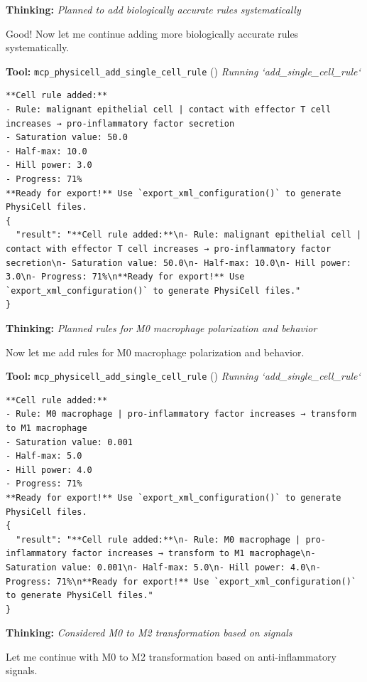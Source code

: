 \documentclass[11pt,a4paper]{article}
\begin{document}
\begin{thinkbox}
\textbf{Thinking:} \textit{Planned to add biologically accurate rules systematically}

Good! Now let me continue adding more biologically accurate rules systematically.

\end{thinkbox}
\begin{toolokbox}
\textbf{Tool:} \texttt{mcp\_physicell\_add\_single\_cell\_rule} (\checkmark)
\textit{Running `add\_single\_cell\_rule`}
\begin{lstlisting}
**Cell rule added:**
- Rule: malignant epithelial cell | contact with effector T cell increases → pro-inflammatory factor secretion
- Saturation value: 50.0
- Half-max: 10.0
- Hill power: 3.0
- Progress: 71%
**Ready for export!** Use `export_xml_configuration()` to generate PhysiCell files.
{
  "result": "**Cell rule added:**\n- Rule: malignant epithelial cell | contact with effector T cell increases → pro-inflammatory factor secretion\n- Saturation value: 50.0\n- Half-max: 10.0\n- Hill power: 3.0\n- Progress: 71%\n**Ready for export!** Use `export_xml_configuration()` to generate PhysiCell files."
}
\end{lstlisting}
\end{toolokbox}
\begin{thinkbox}
\textbf{Thinking:} \textit{Planned rules for M0 macrophage polarization and behavior}

Now let me add rules for M0 macrophage polarization and behavior.

\end{thinkbox}
\begin{toolokbox}
\textbf{Tool:} \texttt{mcp\_physicell\_add\_single\_cell\_rule} (\checkmark)
\textit{Running `add\_single\_cell\_rule`}
\begin{lstlisting}
**Cell rule added:**
- Rule: M0 macrophage | pro-inflammatory factor increases → transform to M1 macrophage
- Saturation value: 0.001
- Half-max: 5.0
- Hill power: 4.0
- Progress: 71%
**Ready for export!** Use `export_xml_configuration()` to generate PhysiCell files.
{
  "result": "**Cell rule added:**\n- Rule: M0 macrophage | pro-inflammatory factor increases → transform to M1 macrophage\n- Saturation value: 0.001\n- Half-max: 5.0\n- Hill power: 4.0\n- Progress: 71%\n**Ready for export!** Use `export_xml_configuration()` to generate PhysiCell files."
}
\end{lstlisting}
\end{toolokbox}
\begin{thinkbox}
\textbf{Thinking:} \textit{Considered M0 to M2 transformation based on signals}

Let me continue with M0 to M2 transformation based on anti-inflammatory signals.

\end{thinkbox}
\end{document}
